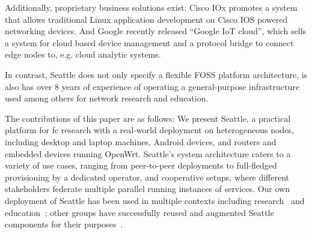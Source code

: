 Additionally, proprietary business  solutions exist: Cisco IOx promotes a
system that allows traditional Linux application development on
Cisco IOS powered networking devices\cite{cisco_iox}.
And Google recently released ``Google IoT cloud'', which sells a system for
cloud based device management and a protocol bridge to connect edge nodes to,
e.g. cloud analytic systems\cite{google_iot_core}.


In contrast, Seattle does not only specify a flexible FOSS platform architecture,
is also has over 8 years of experience of operating a general-purpose
infrastructure used among others for network research and education.

The contributions of this paper are as follows:
We present Seattle, a practical platform for \gls{fc} research
with a real-world deployment on heterogeneous nodes,
including desktop and laptop machines, Android devices,
and routers and embedded devices running OpenWrt.
Seattle's system architecture caters to a variety of use cases,
ranging from peer-to-peer deployments to full-fledged
provisioning by a dedicated operator, and cooperative setups,
where different stakeholders federate multiple parallel running
instances of services.
Our own deployment of Seattle has been used in multiple contexts
including research~\cite{li2015fence,rafetseder2013sensorium,zhuang2014sensibility,Eisl1010:Service,Tuts1010:Sustained,collares2011smart,zhuang2015privacy,cappos2014blursense,7133607} and education~\cite{Wallace_CCSC_2011,Cappos_CCSCCP_2010,Cappos_CCSCNW_2009,Cappos_SIGCSE_2014,Hooshangi_SIGCSE_2015};
other groups have successfully reused and augmented Seattle components
for their purposes~\cite{chard2010social,chard12ssc,caton2014social,muller2014tomato,tomato,eittenberger2012doubtless,zhuang2012distributed,zhuang2014taking,tredger2013building}.
